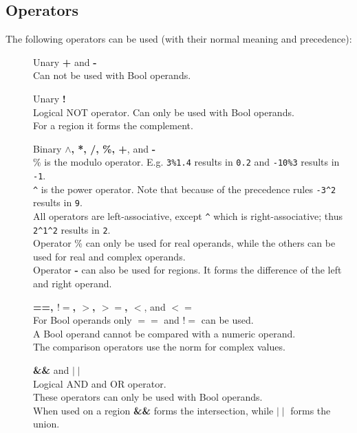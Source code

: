 \subsection{\label{LEL:OPERATORS}Operators}
The following operators can be used (with their normal meaning and
precedence):
\begin{description}
  \item[] Unary \textbf{+} and \textbf{-}
       \\Can not be used with Bool operands.
  \item[] Unary \textbf{!}
       \\Logical NOT operator.
       Can only be used with Bool operands.
       \\For a region it forms the complement.
  \item[] Binary \textbf{$\wedge$, *, /, \%, +}, and \textbf{-}
       \\\% is the modulo operator.
       E.g. \texttt{3\%1.4} results in \texttt{0.2} and
       \texttt{-10\%3} results in \texttt{-1}.
       \\\verb+^+ is the power operator.
       Note that because of the precedence rules
       \texttt{-3}\verb+^+\texttt{2} results in \texttt{9}.
       \\All operators are left-associative, except \verb+^+ which is
       right-associative; thus
       \texttt{2}\verb+^+\texttt{1}\verb+^+\texttt{2} results in \texttt{2}.
       \\Operator \% can only be used for real operands, while the others
       can be used for real and complex operands.
        \\Operator \textbf{-} can also be used for regions. It forms
        the difference of the left and right operand.
  \item[] \textbf{==, $!=$, $>$, $>=$, $<$}, and \textbf{$<=$}
       \\For Bool operands only $==$ and $!=$ can be used.
       \\A Bool operand cannot be compared with a numeric operand.
       \\The comparison operators use the norm for complex values.
  \item[] \textbf{\&\&} and \textbf{$\mid\mid$}
       \\Logical AND and OR operator. 
       \\These operators can only be used with Bool operands.
       \\When used on a region \textbf{\&\&} forms the intersection,
       while \textbf{$\mid\mid$} forms the union.
\end{description}
